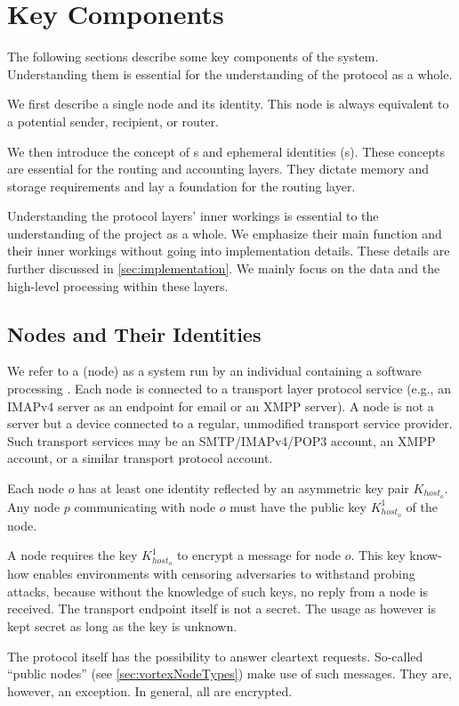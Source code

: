 \section{Key Components}
The following sections describe some key components of the system. Understanding them is essential for the understanding of the protocol as a whole. 

We first describe a single node and its identity. This node is always equivalent to a potential sender, recipient, or router. 

We then introduce the concept of s and ephemeral identities (s). These concepts are essential for the routing and accounting layers. They dictate memory and storage requirements and lay a foundation for the routing layer.

Understanding the protocol layers' inner workings is essential to the understanding of the project as a whole. We emphasize their main function and their inner workings without going into implementation details. These details are further discussed in \cref{sec:implementation}. We mainly focus on the data and the high-level processing within these layers.

\subsection{Nodes and Their Identities}
We refer to a \VortexNode{} (node) as a system run by an individual containing a software processing \VortexMessages. Each node is connected to a transport layer protocol service (e.g., an IMAPv4 server as an endpoint for email or an XMPP server). A node is not a server but a device connected to a regular, unmodified transport service provider. Such transport services may be an SMTP/IMAPv4/POP3 account, an XMPP account, or a similar transport protocol account.

Each node $o$ has at least one identity reflected by an asymmetric key pair $K_{host_o}$. Any node $p$ communicating with node $o$ must have the public key  $K^1_{host_o}$ of the node.

A node requires the key $K^1_{host_o}$ to encrypt a message for node $o$. This key know-how enables environments with censoring adversaries to withstand probing attacks, because without the knowledge of such keys, no reply from a node is received. The transport endpoint itself is not a secret. The usage as \VortexNode however is kept secret as long as the key is unknown.

The protocol itself has the possibility to answer cleartext requests. So-called ``public nodes'' (see \cref{sec:vortexNodeTypes}) make use of such messages. They are, however, an exception. In general, all \VortexMessages{} are encrypted. 

